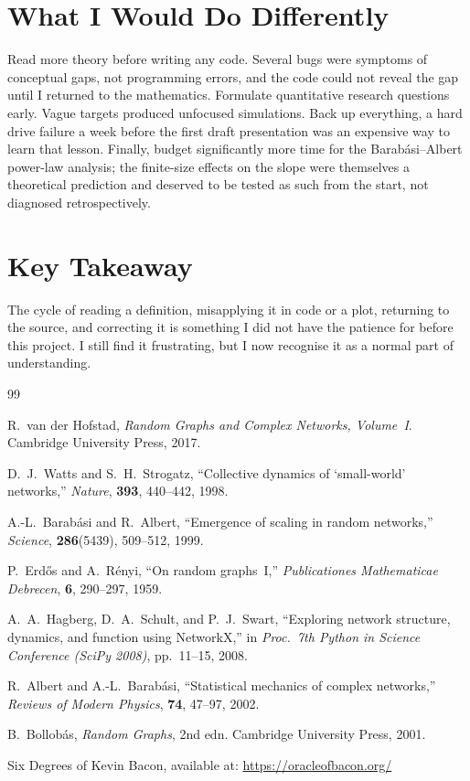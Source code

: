 \documentclass[12pt, a4paper]{report}
\theoremstyle{definition}
\theoremstyle{plain}
\theoremstyle{remark}
\begin{document}
\section*{What I Would Do Differently}

Read more theory before writing any code. Several bugs were symptoms of
conceptual gaps, not programming errors, and the code could not reveal the
gap until I returned to the mathematics. Formulate quantitative research
questions early. Vague targets produced unfocused simulations.
Back up everything, a hard drive failure a week before the first
draft presentation was an expensive way to learn that lesson. Finally, budget
significantly more time for the Barab\'asi--Albert power-law analysis; the
finite-size effects on the slope were themselves a theoretical prediction and
deserved to be tested as such from the start, not diagnosed retrospectively.

\section*{Key Takeaway}

The cycle of reading a definition, misapplying it in code or a plot,
returning to the source, and correcting it is something I did not have
the patience for before this project. I still find it frustrating, but
I now recognise it as a normal part of understanding.

\begin{thebibliography}{99}

  R.~van der Hofstad,
  \textit{Random Graphs and Complex Networks, Volume~I}.
  Cambridge University Press, 2017.

  D.~J.~Watts and S.~H.~Strogatz,
  ``Collective dynamics of `small-world' networks,''
  \textit{Nature}, \textbf{393}, 440--442, 1998.

  A.-L.~Barab\'{a}si and R.~Albert,
  ``Emergence of scaling in random networks,''
  \textit{Science}, \textbf{286}(5439), 509--512, 1999.

  P.~Erd\H{o}s and A.~R\'{e}nyi,
  ``On random graphs~I,''
  \textit{Publicationes Mathematicae Debrecen}, \textbf{6},
  290--297, 1959.

  A.~A.~Hagberg, D.~A.~Schult, and P.~J.~Swart,
  ``Exploring network structure, dynamics, and function using
  NetworkX,''
  in \textit{Proc.\ 7th Python in Science Conference (SciPy 2008)},
  pp.~11--15, 2008.

  R.~Albert and A.-L.~Barab\'{a}si,
  ``Statistical mechanics of complex networks,''
  \textit{Reviews of Modern Physics}, \textbf{74}, 47--97, 2002.

  B.~Bollob\'{a}s,
  \textit{Random Graphs}, 2nd edn.
  Cambridge University Press, 2001.

  Six Degrees of Kevin Bacon, available at:
  \url{https://oracleofbacon.org/}

\end{thebibliography}
\end{document}
